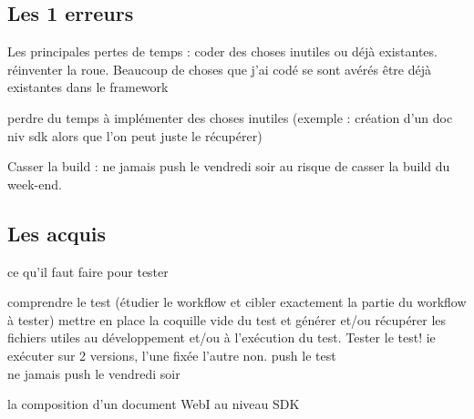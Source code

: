 \subsection{Les 1 erreurs}

Les principales pertes de temps : coder des choses inutiles ou d\'{e}j\`{a} existantes.\\
r\'{e}inventer la roue. Beaucoup de choses que j'ai cod\'{e} se sont av\'{e}r\'{e}s \^{e}tre d\'{e}j\`{a} existantes dans le framework

perdre du temps \`{a} impl\'{e}menter des choses inutiles (exemple : cr\'{e}ation d'un doc niv sdk alors que l'on peut juste  le r\'{e}cup\'{e}rer)

Casser la build : ne jamais push le vendredi soir au risque de casser la build du week-end.

\subsection{Les acquis}
ce qu'il faut faire pour tester

comprendre le test (\'{e}tudier le workflow et cibler exactement la partie du workflow \`{a} tester)
mettre en place la coquille vide du test et g\'{e}n\'{e}rer et/ou r\'{e}cup\'{e}rer les fichiers utiles au d\'{e}veloppement et/ou \`{a} l'ex\'{e}cution du test.
Tester le test! ie ex\'{e}cuter sur 2 versions, l'une fix\'{e}e l'autre non.
push le test\\ 

ne jamais push le vendredi soir

la composition d'un document WebI au niveau SDK

